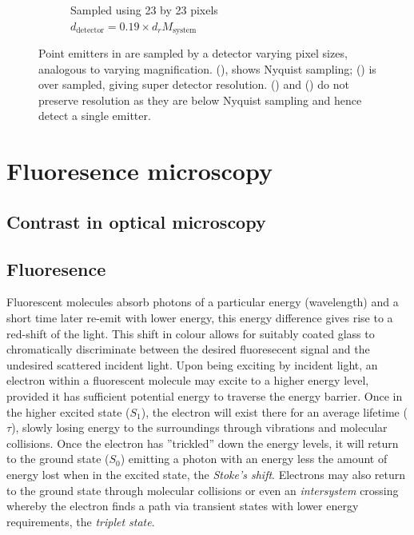 \begin{figure}
\begin{subfigure}[b]{0.4\textwidth}
        \caption{Sampled using 23 by 23 pixels\\$d_{\text{detector}} = 0.19 \times d_{r}M_{\text{system}}$}
        \label{fig:digital_airy_sample_23}
    \end{subfigure}
    \caption{Point emitters in  are sampled by a detector varying pixel sizes, analogous to varying magnification.
    (), shows Nyquist sampling;
    () is over sampled, giving super detector resolution.
    () and () do not preserve resolution as they are below Nyquist sampling and hence detect a single emitter.}
    \label{fig:airy_disk_resolution}
\end{figure}


%
%


\section{Fluoresence microscopy}
\subsection{Contrast in optical microscopy}
\subsection{Fluoresence}

Fluorescent molecules absorb photons of a particular energy (wavelength) and a short time later re-emit with lower energy, this energy difference gives rise to a red-shift of the light.
This shift in colour allows for suitably coated glass to chromatically discriminate between the desired fluoresecent signal and the undesired scattered incident light.
Upon being exciting by incident light, an electron within a fluorescent molecule may excite to a higher energy level, provided it has sufficient potential energy to traverse the energy barrier.
Once in the higher excited state ($S_1$), the electron will exist there for an average lifetime ($\tau$), slowly losing energy to the surroundings through vibrations and molecular collisions.
Once the electron has ''trickled'' down the energy levels, it will return to the ground state ($S_0$) emitting a photon with an energy less the amount of energy lost when in the excited state, the \emph{Stoke's shift}.
Electrons may also return to the ground state through molecular collisions or even an \emph{intersystem} crossing whereby the electron finds a path via transient states with lower energy requirements, the \emph{triplet state}.


